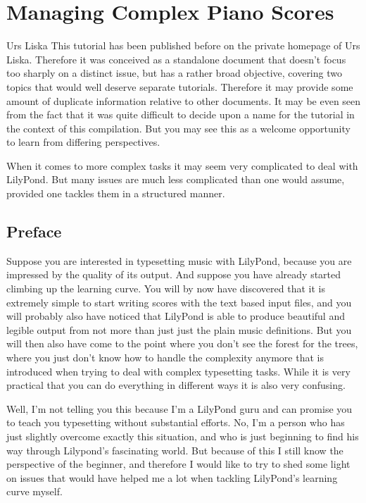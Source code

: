 \documentclass[../../LilyPond-Tutorials]{subfiles}
\begin{document}
\chapter{Managing Complex Piano Scores}
\begin{authorAbstract}{Urs Liska}
This tutorial has been published before on the private homepage of Urs Liska. 
Therefore it was conceived as a standalone document that doesn't focus too sharply on a distinct issue, but has a rather broad objective, covering two topics that would well deserve separate tutorials.
Therefore it may provide some amount of duplicate information relative to other documents. It may be even seen from the fact that it was quite difficult to decide upon a name for the tutorial in the context of this compilation.
But you may see this as a welcome opportunity to learn from differing perspectives.

When it comes to more complex tasks it may seem very complicated to deal with LilyPond.
But many issues are much less complicated than one would assume, provided one tackles them in a structured manner.
\end{authorAbstract}

\section*{Preface}

Suppose you are interested in typesetting music with LilyPond, because you are impressed by the quality of its output. 
And suppose you have already started climbing up the learning curve. 
You will by now have discovered that it is extremely simple to start writing scores with the text based input files, and you will probably also have noticed that LilyPond is able to produce beautiful and legible output from not more than just just the plain music definitions. 
But you will then also have come to the point where you don't see the forest for the trees, where you just don't know how to handle the complexity anymore that is introduced when trying to deal with complex typesetting tasks. 
While it is very practical that you can do everything in different ways it is also very confusing.

Well, I'm not telling you this because I'm a LilyPond guru and can promise you to teach you typesetting without substantial efforts. 
No, I'm a person who has just slightly overcome exactly this situation, and who is just beginning to find his way through Lilypond's fascinating world. 
But because of this I still know the perspective of the beginner, and therefore I would like to try to shed some light on issues that would have helped me a lot when tackling LilyPond's learning curve myself.
\end{document}
